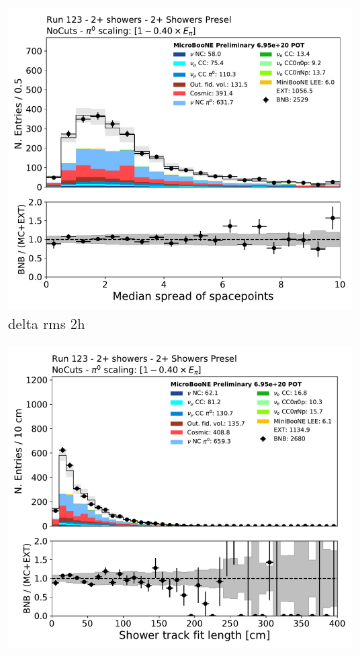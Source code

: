 \begin{figure}[H]
    \centering
    \begin{subfigure}{0.3\textwidth}
    \includegraphics[width=1.0\textwidth]{Sidebands/Figures/TwoShr_1e0pSel/Presel/DeltaRMS2h.pdf}
    \caption{delta rms 2h}
    \end{subfigure}
    \begin{subfigure}{0.3\textwidth}
    \includegraphics[width=1.0\textwidth]{Sidebands/Figures/TwoShr_1e0pSel/Presel/shr_trk_len.pdf}

\end{subfigure}
\end{figure}
